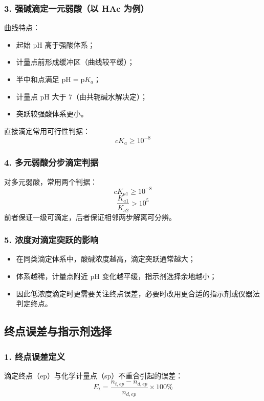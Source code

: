 \documentclass[12pt,a4paper]{article}
\numberwithin{equation}{section}
\begin{document}
\subsubsection{3. 强碱滴定一元弱酸（以 HAc 为例）}
曲线特点：
\begin{itemize}
    \item 起始 pH 高于强酸体系；
    \item 计量点前形成缓冲区（曲线较平缓）；
    \item 半中和点满足 $\mathrm{pH}=\mathrm{p}K_a$；
    \item 计量点 pH 大于 7（由共轭碱水解决定）；
    \item 突跃较强酸体系更小。
\end{itemize}

直接滴定常用可行性判据：
\begin{equation}
cK_a\ge 10^{-8}
\end{equation}

\subsubsection{4. 多元弱酸分步滴定判据}
对多元弱酸，常用两个判据：
\begin{equation}
cK_{a1}\ge 10^{-8}
\end{equation}
\begin{equation}
\frac{K_{a1}}{K_{a2}}>10^5
\end{equation}
前者保证一级可滴定，后者保证相邻两步解离可分辨。

\subsubsection{5. 浓度对滴定突跃的影响}
\begin{itemize}
    \item 在同类滴定体系中，酸碱浓度越高，滴定突跃通常越大；
    \item 体系越稀，计量点附近 pH 变化越平缓，指示剂选择余地越小；
    \item 因此低浓度滴定时更需要关注终点误差，必要时改用更合适的指示剂或仪器法判定终点。
\end{itemize}

\subsection{终点误差与指示剂选择}

\subsubsection{1. 终点误差定义}
滴定终点（ep）与化学计量点（sp）不重合引起的误差：
\begin{equation}
E_t=\frac{n_{t,ep}-n_{d,ep}}{n_{d,ep}}\times 100\%
\end{equation}
\end{document}
